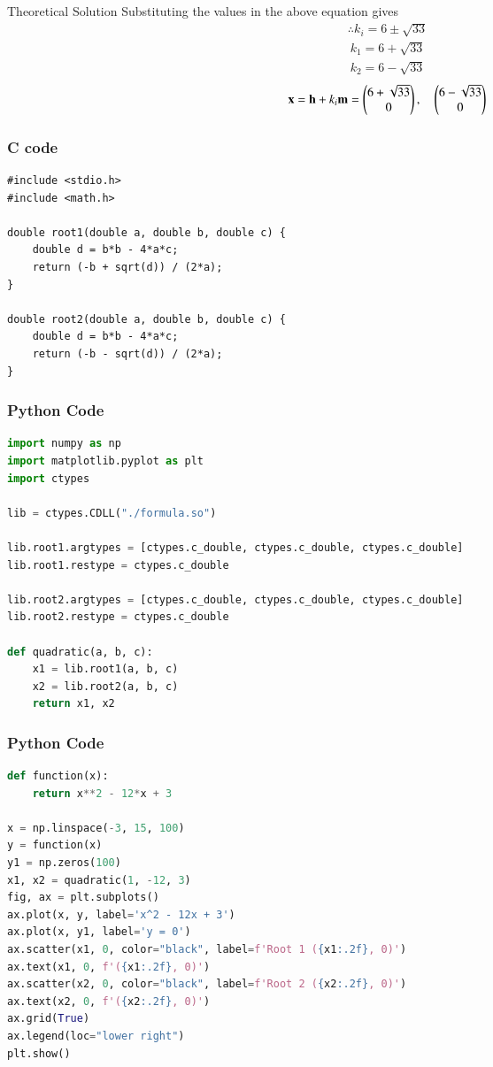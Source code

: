 \documentclass{beamer}
\begin{document}
\begin{frame}{Theoretical Solution}
Substituting the values in the above equation gives
\begin{align}
\therefore k_i =6 \pm \sqrt{33}
\end{align}
\begin{align}
 k_1 = 6 + \sqrt{33}\\
 k_2 = 6 - \sqrt{33}
\end{align}
\begin{align}
    \mathbf{x} = \mathbf{h} + k_i\mathbf{m}
   = \begin{pmatrix}6 + \sqrt{33} \\ 0\end{pmatrix},\quad
     \begin{pmatrix}6 - \sqrt{33} \\ 0\end{pmatrix}
\end{align}
\end{frame}
\begin{frame}[fragile]
    \frametitle{C code}
    \begin{lstlisting}
#include <stdio.h>
#include <math.h>

double root1(double a, double b, double c) {
    double d = b*b - 4*a*c;
    return (-b + sqrt(d)) / (2*a);
}

double root2(double a, double b, double c) {
    double d = b*b - 4*a*c;
    return (-b - sqrt(d)) / (2*a);
}
    \end{lstlisting}
\end{frame}

\begin{frame}[fragile]
    \frametitle{Python Code}
    \begin{lstlisting}[language=Python]
import numpy as np
import matplotlib.pyplot as plt
import ctypes

lib = ctypes.CDLL("./formula.so")

lib.root1.argtypes = [ctypes.c_double, ctypes.c_double, ctypes.c_double]
lib.root1.restype = ctypes.c_double

lib.root2.argtypes = [ctypes.c_double, ctypes.c_double, ctypes.c_double]
lib.root2.restype = ctypes.c_double

def quadratic(a, b, c):
    x1 = lib.root1(a, b, c)
    x2 = lib.root2(a, b, c)
    return x1, x2
    \end{lstlisting}
\end{frame}
\begin{frame}[fragile]
    \frametitle{Python Code}
    \begin{lstlisting}[language=Python]
def function(x):
    return x**2 - 12*x + 3

x = np.linspace(-3, 15, 100)
y = function(x)
y1 = np.zeros(100)
x1, x2 = quadratic(1, -12, 3)
fig, ax = plt.subplots()
ax.plot(x, y, label='x^2 - 12x + 3') 
ax.plot(x, y1, label='y = 0')
ax.scatter(x1, 0, color="black", label=f'Root 1 ({x1:.2f}, 0)')
ax.text(x1, 0, f'({x1:.2f}, 0)')
ax.scatter(x2, 0, color="black", label=f'Root 2 ({x2:.2f}, 0)')
ax.text(x2, 0, f'({x2:.2f}, 0)')
ax.grid(True)
ax.legend(loc="lower right")
plt.show()
    \end{lstlisting}
\end{frame}
\end{document}
